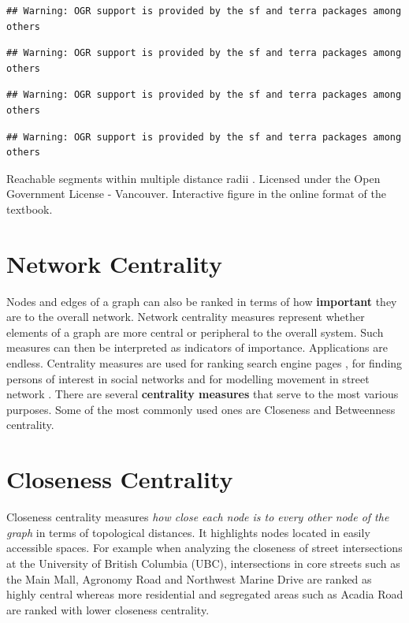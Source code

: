 \documentclass[
]{book}
\begin{document}
\begin{verbatim}
## Warning: OGR support is provided by the sf and terra packages among others
\end{verbatim}

\begin{verbatim}
## Warning: OGR support is provided by the sf and terra packages among others
\end{verbatim}

\begin{verbatim}
## Warning: OGR support is provided by the sf and terra packages among others
\end{verbatim}

\begin{verbatim}
## Warning: OGR support is provided by the sf and terra packages among others
\end{verbatim}

\label{fig:8-reach-analysis}Reachable segments within multiple distance radii \citep{city_of_vancouver_open_nodate}. Licensed under the Open Government License - Vancouver. Interactive figure in the online format of the textbook.

\hypertarget{network-centrality}{%
\section{Network Centrality}\label{network-centrality}}

Nodes and edges of a graph can also be ranked in terms of how \textbf{important} they are to the overall network. Network centrality measures represent whether elements of a graph are more central or peripheral to the overall system. Such measures can then be interpreted as indicators of importance. Applications are endless. Centrality measures are used for ranking search engine pages \citep{wikimedia_pagerank_2021}, for finding persons of interest in social networks \citep{ajorlou_introduction_2018} and for modelling movement in street network \citep{hillier_natural_1993}. There are several \textbf{centrality measures} that serve to the most various purposes. Some of the most commonly used ones are Closeness and Betweenness centrality.

\hypertarget{closeness-centrality}{%
\section{Closeness Centrality}\label{closeness-centrality}}

Closeness centrality measures \emph{how close each node is to every other node of the graph} in terms of topological distances. It highlights nodes located in easily accessible spaces. For example when analyzing the closeness of street intersections at the University of British Columbia (UBC), intersections in core streets such as the Main Mall, Agronomy Road and Northwest Marine Drive are ranked as highly central whereas more residential and segregated areas such as Acadia Road are ranked with lower closeness centrality.
\end{document}

